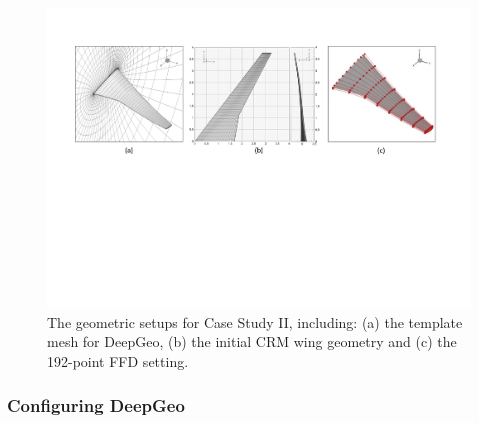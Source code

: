 \begin{figure}[!tb]
    \begin{center}
        \includegraphics[width=1\linewidth]{chapter5/fig/crm_template_mesh_initial_geometry.pdf}
    \end{center}
    \caption{
        \small The geometric setups for Case Study II, including: (a) the template mesh for DeepGeo, (b) the initial CRM wing geometry and (c) the 192-point FFD setting.
    }
    \label{ch5:fig:cs2_template_mesh}
\end{figure}

\subsubsection{Configuring DeepGeo}

